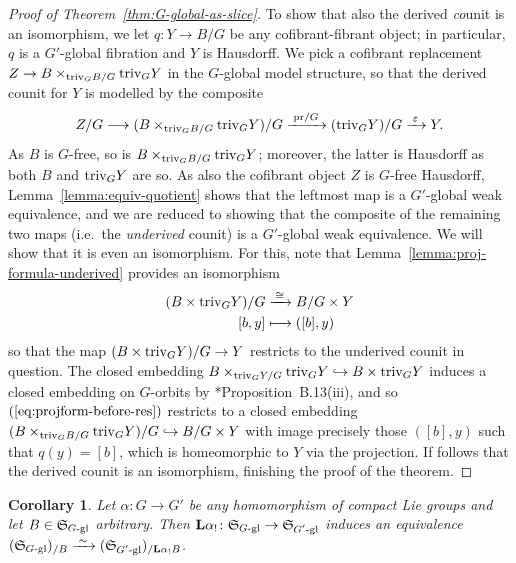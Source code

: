 \documentclass[reqno]{memo-l}
\theoremstyle{mythm}
\newtheorem{cor}[thm]{Corollary}
\theoremstyle{definition}
\numberwithin{equation}{section}
\renewcommand{\epsilon}{\varepsilon}
\newcommand{\cat}[1]{\textbf{\textup{#1}}}
\newcommand{\triv}{{\textup{triv}}}
\newcommand{\pr}{\textup{pr}}
\newcommand{\iso}{\xrightarrow{\;\smash{\raisebox{-0.25ex}{\ensuremath{\scriptstyle\sim}}}\;}}
\newcommand{\myS}{{{\mathfrak S\kern-.4pt}}}
\begin{document}
\begin{proof}[Proof of Theorem~\ref{thm:G-global-as-slice}]
    To show that also the derived \emph{co}unit is an isomorphism, we let $q\colon Y\to B/G$ be any cofibrant-fibrant object; in particular, $q$ is a $G'$-global fibration and $Y$ is Hausdorff. We pick a cofibrant replacement $Z\to B\times_{\triv_G B/G} \triv_G Y$ in the $G$-global model structure, so that the derived counit for $Y$ is modelled by the composite
    \begin{equation}\label{eq:derived-unit-local-equiv}
        Z/G\longrightarrow (B\times_{\triv_G B/G} \triv_GY)/G\xrightarrow{\;\pr/G\;} (\triv_GY)/G\xrightarrow{\;\epsilon\;}Y.
    \end{equation}
    As $B$ is $G$-free, so is $B\times_{\triv_GB/G}\triv_GY$; moreover, the latter is Hausdorff as both $B$ and $\triv_GY$ are so. As also the cofibrant object $Z$ is $G$-free Hausdorff, Lemma~\ref{lemma:equiv-quotient} shows that the leftmost map is a $G'$-global weak equivalence, and we are reduced to showing that the composite of the remaining two maps (i.e.\ the \emph{underived} counit) is a $G'$-global weak equivalence. We will show that it is even an isomorphism. For this, note that Lemma~\ref{lemma:proj-formula-underived} provides an isomorphism
    \begin{equation}\label{eq:projform-before-res}
        \begin{aligned}
            (B \times \triv_GY)/G&\xrightarrow{\kern.4pt\,\cong\,\kern.4pt} B/G\times Y\\
            [b,y]&\longmapsto ([b], y)
        \end{aligned}
    \end{equation}
    so that the map $(B\times\triv_GY)/G\to Y$ restricts to the underived counit in question. The closed embedding $B\times_{\triv_GY/G} \triv_GY\hookrightarrow B\times\triv_GY$  induces a closed embedding on $G$-orbits by \cite{schwede2018global}*{Proposition~B.13(iii)}, and so $(\ref{eq:projform-before-res})$ restricts to a closed embedding $(B\times_{\triv_GB/G}\triv_GY)/G\hookrightarrow B/G\times Y$ with image precisely those $([b],y)$ such that $q(y)=[b]$, which is homeomorphic to $Y$ via the projection. If follows that the derived counit is an isomorphism, finishing the proof of the theorem.
\end{proof}

\begin{cor}\label{cor:slice-adjoint-equiv}
    Let $\alpha\colon G\to G'$ be any homomorphism of compact Lie groups and let $B\in\myS_\textup{$G$-gl}$ arbitrary. Then $\cat{L}\alpha_!\colon\myS_\textup{$G$-gl}\to\myS_\textup{$G'$-gl}$ induces an equivalence $(\myS_\textup{$G$-gl})_{/B}\iso(\myS_\textup{$G'$-gl})_{/\cat{L}\alpha_!B}$.
\end{cor}
\end{document}
